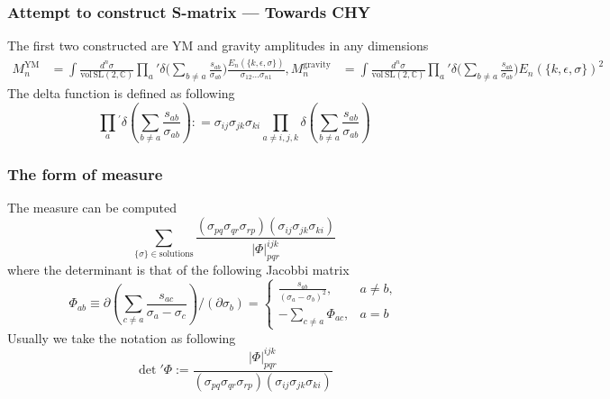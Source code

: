 \documentclass{beamer}
\begin{document}
\begin{frame}
    \frametitle{Attempt to construct S-matrix --- Towards CHY}
    The first two constructed are YM and gravity amplitudes in any dimensions
    \begin{align*}
        M_n^{\mathrm{YM}}&=\int\frac{d^n\sigma}{\mathrm{vol\,SL}(2,\mathbb{C})}\prod_a{'}\delta\bigg(\sum_{b\neq a}\frac{s_{ab}}{\sigma_{ab}}\bigg)\frac{E_n(\{k,\epsilon,\sigma\})}{\sigma_{12}\dots\sigma_{n1}},
        M_n^{\mathrm{gravity}}&=\int\frac{d^n\sigma}{\mathrm{vol\,SL}(2,\mathbb{C})}\prod_a{'}\delta\bigg(\sum_{b\neq a}\frac{s_{ab}}{\sigma_{ab}}\bigg)E_n(\{k,\epsilon,\sigma\})^2
    \end{align*}
    \pause
    The delta function is defined as following
    \begin{equation*}
        \prod_{a}{}^{\prime}\delta{\left(\sum_{b\neq a}\frac{s_{ab}}{\sigma_{ab}}\right)}{:}=\sigma_{ij}\sigma_{jk}\sigma_{ki}\prod_{a\neq i,j,k}\delta{\left(\sum_{b\neq a}\frac{s_{ab}}{\sigma_{ab}}\right)}
    \end{equation*}
\end{frame}
\begin{frame}
    \frametitle{The form of measure}
    The measure can be computed %
    \begin{equation*}
            \boxed{
            \sum_{\{\sigma\}\in\mathrm{solutions}}\frac{(\sigma_{pq}\sigma_{qr}\sigma_{rp})(\sigma_{ij}\sigma_{jk}\sigma_{ki})}{|\Phi|_{pqr}^{ijk}}}
    \end{equation*}
    where the determinant is that of the following Jacobbi matrix
    \begin{equation*}
        \Phi_{ab}\equiv\partial\left(\sum_{c\neq a}\frac{s_{ac}}{\sigma_a-\sigma_c}\right)/\left(\partial\sigma_b\right)=\begin{cases}\frac{s_{ab}}{(\sigma_a-\sigma_b)^2},&a\neq b,\\-\sum_{c\neq a}\Phi_{ac}, &a=b\end{cases}
    \end{equation*}
    \pause
    Usually we take the notation as following
    \begin{equation*}
        \boxed{
        \det{'}\Phi:=\frac{|\Phi|_{pqr}^{ijk}}{(\sigma_{pq}\sigma_{qr}\sigma_{rp})(\sigma_{ij}\sigma_{jk}\sigma_{ki})}}
    \end{equation*}
\end{frame}
\end{document}
